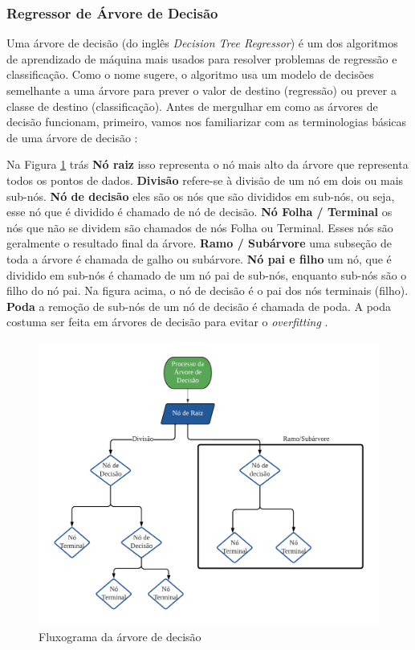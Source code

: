 \subsubsection{Regressor de \'Arvore de Decis\~ao }


Uma árvore de decisão (do ingl\^es \textit{Decision Tree Regressor}) é um dos algoritmos de aprendizado de máquina mais usados para resolver problemas de regressão e classificação. Como o nome sugere, o algoritmo usa um modelo de decisões semelhante a uma árvore para prever o valor de destino (regressão) ou prever a classe de destino (classificação). Antes de mergulhar em como as árvores de decisão funcionam, primeiro, vamos nos familiarizar com as terminologias básicas de uma árvore de decisão \cite{decision}:

Na Figura \ref{fig:decison} trás \textbf{Nó raiz} isso representa o nó mais alto da árvore que representa todos os pontos de dados.
\textbf{Divisão} refere-se à divisão de um nó em dois ou mais sub-nós.
\textbf{Nó de decisão} eles são os nós que são divididos em sub-nós, ou seja, esse nó que é dividido é chamado de nó de decisão.
\textbf{Nó Folha / Terminal} os nós que não se dividem são chamados de nós Folha ou Terminal. Esses nós são geralmente o resultado final da árvore.
\textbf{Ramo / Subárvore} uma subseção de toda a árvore é chamada de galho ou subárvore.
\textbf{Nó pai e filho} um nó, que é dividido em sub-nós é chamado de um nó pai de sub-nós, enquanto sub-nós são o filho do nó pai. Na figura acima, o nó de decisão é o pai dos nós terminais (filho).
\textbf{Poda} a remoção de sub-nós de um nó de decisão é chamada de poda. A poda costuma ser feita em árvores de decisão para evitar o \textit{overfitting}  \cite{decision}.

\begin{figure}[H]
	\centering
	\caption{Fluxograma da árvore de decisão}
	\label{fig:decison}
	\includegraphics[width=0.9\linewidth]{Modelos/Figuras/decison}
	
\end{figure}



